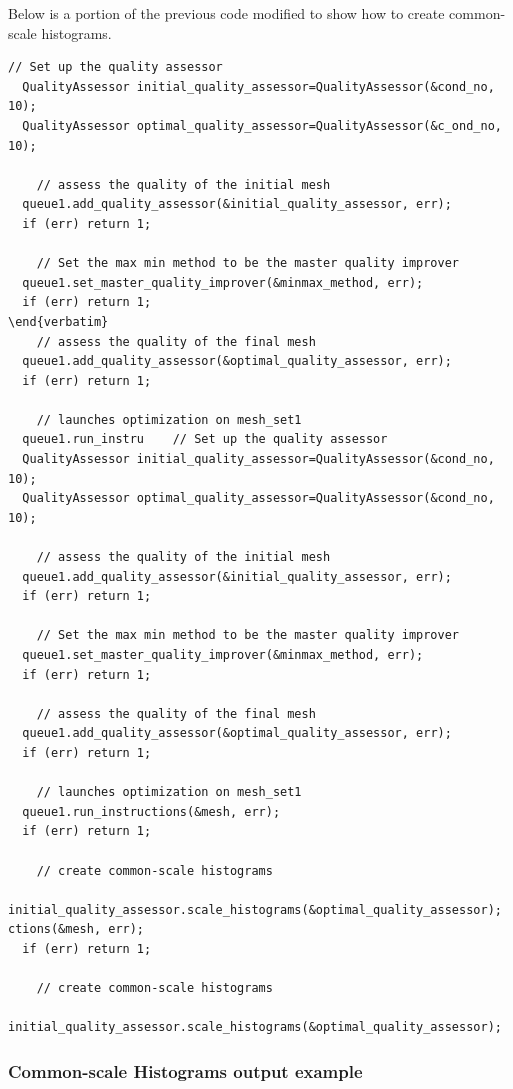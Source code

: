  Below is a portion of the previous code modified to show how to create common-scale histograms.
\begin{lstlisting}[frame=single]
    // Set up the quality assessor
  QualityAssessor initial_quality_assessor=QualityAssessor(&cond_no, 10);
  QualityAssessor optimal_quality_assessor=QualityAssessor(&c_ond_no, 10);

    // assess the quality of the initial mesh
  queue1.add_quality_assessor(&initial_quality_assessor, err);
  if (err) return 1;

    // Set the max min method to be the master quality improver
  queue1.set_master_quality_improver(&minmax_method, err);
  if (err) return 1;
\end{verbatim}
    // assess the quality of the final mesh
  queue1.add_quality_assessor(&optimal_quality_assessor, err);
  if (err) return 1;

    // launches optimization on mesh_set1
  queue1.run_instru    // Set up the quality assessor
  QualityAssessor initial_quality_assessor=QualityAssessor(&cond_no, 10);
  QualityAssessor optimal_quality_assessor=QualityAssessor(&cond_no, 10);

    // assess the quality of the initial mesh
  queue1.add_quality_assessor(&initial_quality_assessor, err);
  if (err) return 1;

    // Set the max min method to be the master quality improver
  queue1.set_master_quality_improver(&minmax_method, err);
  if (err) return 1;

    // assess the quality of the final mesh
  queue1.add_quality_assessor(&optimal_quality_assessor, err);
  if (err) return 1;

    // launches optimization on mesh_set1
  queue1.run_instructions(&mesh, err);
  if (err) return 1;

    // create common-scale histograms
  initial_quality_assessor.scale_histograms(&optimal_quality_assessor);
ctions(&mesh, err);
  if (err) return 1;

    // create common-scale histograms
  initial_quality_assessor.scale_histograms(&optimal_quality_assessor);

\end{lstlisting}

\clearpage
\subsubsection{Common-scale Histograms output example}

